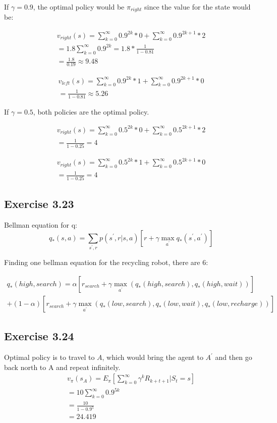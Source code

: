 If $\gamma = 0.9$, the optimal policy would be $\pi_{right}$ since the value for the state would be:

\begin{gather}
  v_{right}(s) = \sum_{k=0}^\infty 0.9^{2k} * 0 + \sum_{k=0}^\infty 0.9^{2k+1}*2 \\
  = 1.8\sum_{k=0}^\infty 0.9^{2k} = 1.8 * \frac{1}{1-0.81}\\
  = \frac{1.8}{0.19} \approx 9.48
\end{gather}

\begin{gather}
  v_{left}(s) = \sum_{k=0}^\infty 0.9^{2k} * 1 + \sum_{k=0}^\infty 0.9^{2k+1}*0 \\
  = \frac{1}{1-0.81} \approx 5.26
\end{gather}

If $\gamma = 0.5$, both policies are the optimal policy.

\begin{gather}
  v_{right}(s) = \sum_{k=0}^\infty 0.5^{2k} * 0 + \sum_{k=0}^\infty 0.5^{2k+1}*2 \\
  = \frac{1}{1-0.25} = 4
\end{gather}

\begin{gather}
  v_{right}(s) = \sum_{k=0}^\infty 0.5^{2k} * 1 + \sum_{k=0}^\infty 0.5^{2k+1}*0 \\
  = \frac{1}{1-0.25} = 4
\end{gather}

\subsection{Exercise 3.23}
Bellman equation for q:
\begin{equation}
  q_*(s,a) = \sum_{s^\prime, r} p(s^\prime, r | s,a)[r+\gamma \max_{a^\prime} q_*(s^\prime, a^\prime)]
\end{equation}

Finding one bellman equation for the recycling robot, there are 6:

\begin{gather}
  q_*(high,search) = \alpha[r_{search}+\gamma \max_{a^\prime}(q_*(high,search),q_*(high,wait))] \\+ (1-\alpha)[r_{search}+\gamma \max_{a^\prime}(q_*(low,search),q_*(low,wait),q_*(low,recharge))]
\end{gather}

\subsection{Exercise 3.24}
Optimal policy is to travel to $A$, which would bring the agent to $A^\prime$ and then go back north to A and repeat infinitely.
\begin{gather}
  v_\pi(s_A) =  E_\pi[\sum_{k=0}^\infty \gamma^k R_{k+t+1}|S_t = s] \\
  = 10 \sum_{k=0}^\infty 0.9^{5k} \\
  = \frac{10}{1-0.9^5} \\
  = 24.419
\end{gather}

